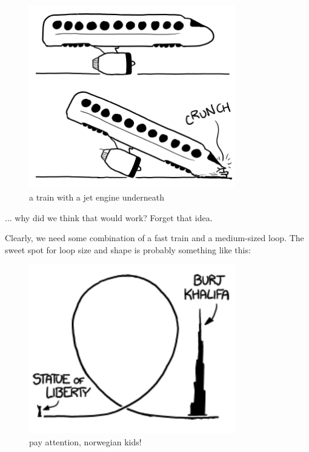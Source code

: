 {\begin{figure}[!htbp]
\centering
\includegraphics[scale=0.5, max width=0.8\textwidth]{imgs/a/43/train_loop_jet_bottom.png}
\caption{a train with a jet engine underneath}
\end{figure}

{... why did we think that would work? Forget that idea.}

{Clearly, we need some combination of a fast train and a medium-sized loop. The sweet spot for loop size and shape is probably something like this:}

\begin{figure}[!htbp]
\centering
\includegraphics[scale=0.5, max width=0.8\textwidth]{imgs/a/43/train_loop_clothoid.png}
\caption{pay attention, norwegian kids!}
\end{figure}

}
